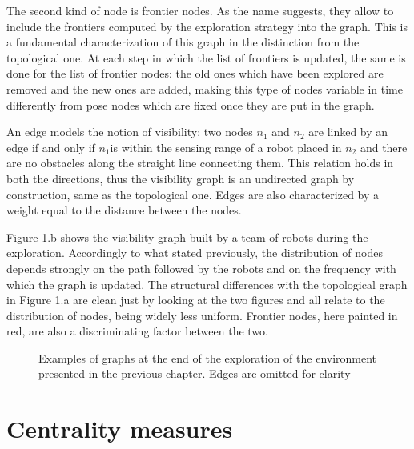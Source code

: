 The second kind of node is frontier nodes. As the name suggests, they
allow to include the frontiers computed by the exploration strategy
into the graph. This is a fundamental characterization of this graph
in the distinction from the topological one. At each step in which
the list of frontiers is updated, the same is done for the list of
frontier nodes: the old ones which have been explored are removed
and the new ones are added, making this type of nodes variable in
time differently from pose nodes which are fixed once they are put
in the graph.

An edge models the notion of visibility: two nodes $n_{1}$ and $n_{2}$
are linked by an edge if and only if $n_{1}$is within the sensing
range of a robot placed in $n_{2}$ and there are no obstacles along
the straight line connecting them. This relation holds in both the
directions, thus the visibility graph is an undirected graph by construction,
same as the topological one. Edges are also characterized by a weight
equal to the distance between the nodes.

Figure 1.b shows the visibility graph built by a team of robots during
the exploration. Accordingly to what stated previously, the distribution
of nodes depends strongly on the path followed by the robots and on
the frequency with which the graph is updated. The structural differences
with the topological graph in Figure 1.a are clean just by looking
at the two figures and all relate to the distribution of nodes, being
widely less uniform. Frontier nodes, here painted in red, are also
a discriminating factor between the two.

\begin{figure}
\quad{}

\caption{Examples of graphs at the end of the exploration of the environment
presented in the previous chapter. Edges are omitted for clarity}
\end{figure}


\section{Centrality measures}

